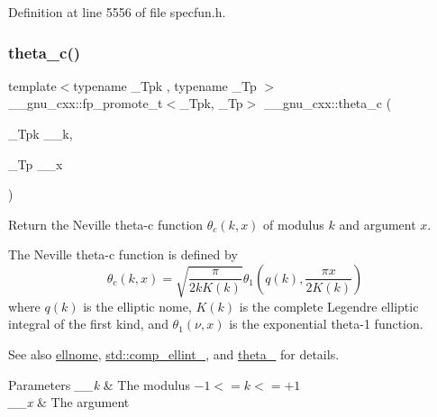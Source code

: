 Definition at line 5556 of file specfun.\+h.

\mbox{\label{group__gnu__math__spec__func_ga3ebbb6513c39e1d55b08cba7d169ce3d}} 
\subsubsection{\texorpdfstring{theta\+\_\+c()}{theta\_c()}}
{\footnotesize\ttfamily template$<$typename \+\_\+\+Tpk , typename \+\_\+\+Tp $>$ \\
\+\_\+\+\_\+gnu\+\_\+cxx\+::fp\+\_\+promote\+\_\+t$<$\+\_\+\+Tpk, \+\_\+\+Tp$>$ \+\_\+\+\_\+gnu\+\_\+cxx\+::theta\+\_\+c (\begin{DoxyParamCaption}\item[{\+\_\+\+Tpk}]{\+\_\+\+\_\+k,  }\item[{\+\_\+\+Tp}]{\+\_\+\+\_\+x }\end{DoxyParamCaption})\hspace{0.3cm}{\ttfamily [inline]}}

Return the Neville theta-\/c function $ \theta_c(k,x) $ of modulus $ k $ and argument $ x $.

The Neville theta-\/c function is defined by \[ \theta_c(k,x) = \sqrt{\frac{\pi}{2 k K(k)}} \theta_1\left(q(k),\frac{\pi x}{2K(k)}\right) \] where $ q(k) $ is the elliptic nome, $ K(k) $ is the complete Legendre elliptic integral of the first kind, and $ \theta_1(\nu,x) $ is the exponential theta-\/1 function. \begin{DoxySeeAlso}{See also}
\hyperlink{group__gnu__math__spec__func_ga7bfb34f8b5c0ed7c72040f9cb7034bba}{ellnome}, \hyperlink{group__tr29124__math__spec__func_gad559217fb01e7a8b7a6e23eeedda64be}{std\+::comp\+\_\+ellint\+\_}, and \hyperlink{group__gnu__math__spec__func_gaa2e5a3a5f550fe032a596a8b01c878c0}{theta\+\_} for details.
\end{DoxySeeAlso}

\begin{DoxyParams}{Parameters}
{\em \+\_\+\+\_\+k} & The modulus $ -1 <= k <= +1 $ \\
\hline
{\em \+\_\+\+\_\+x} & The argument \\
\hline
\end{DoxyParams}


